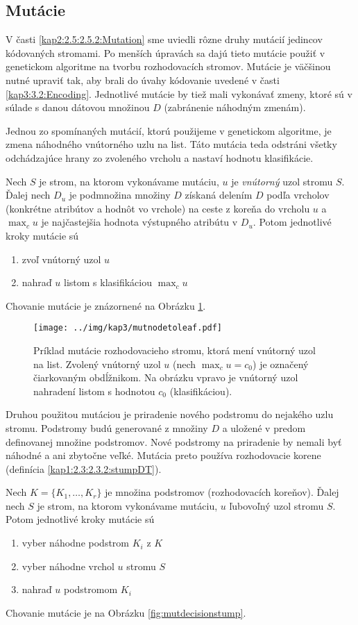 \subsection{Mutácie}\label{kap3:3.4:3.4.2:Mutation}
V časti \ref{kap2:2.5:2.5.2:Mutation} sme uviedli rôzne druhy mutácií jedincov kódovaných stromami. Po menších úpravách sa dajú tieto mutácie použiť v genetickom algoritme na tvorbu rozhodovacích stromov. Mutácie je väčšinou nutné upraviť tak, aby brali do úvahy kódovanie uvedené v časti \ref{kap3:3.2:Encoding}. Jednotlivé mutácie by tiež mali vykonávať zmeny, ktoré sú v súlade s danou dátovou množinou $D$ (zabránenie náhodným zmenám).

Jednou zo spomínaných mutácií, ktorú použijeme v genetickom algoritme, je zmena náhodného vnútorného uzlu na list. Táto mutácia teda odstráni všetky odchádzajúce hrany zo zvoleného vrcholu a nastaví hodnotu klasifikácie.

Nech $S$ je strom, na ktorom vykonávame mutáciu, $u$ je \emph{vnútorný} uzol stromu $S$. Ďalej nech $D_u$ je podmnožina množiny $D$ získaná delením $D$ podľa vrcholov (konkrétne atribútov a hodnôt vo vrchole) na ceste z koreňa do vrcholu $u$ a $\max_c u$ je najčastejšia hodnota výstupného atribútu v $D_u$. Potom jednotlivé kroky mutácie sú
\begin{enumerate}
\item zvoľ vnútorný uzol $u$
\item nahraď $u$ listom s klasifikáciou $\max_c u$
\end{enumerate}
Chovanie mutácie je znázornené na Obrázku \ref{fig:mutnodetoleaf}.

\begin{figure}[h]
\centering
\centerline{\mbox{\texttt{[image: ../img/kap3/mutnodetoleaf.pdf]}}}
\caption{Príklad mutácie rozhodovacieho stromu, ktorá mení vnútorný uzol na list. Zvolený vnútorný uzol $u$ (nech $\max_c u = c_0$) je označený čiarkovaným obdĺžnikom. Na obrázku vpravo je vnútorný uzol nahradení listom s hodnotou $c_0$ (klasifikáciou).}\label{fig:mutnodetoleaf}
\end{figure}

Druhou použitou mutáciou je priradenie nového podstromu do nejakého uzlu stromu. Podstromy budú generované z množiny $D$ a uložené v predom definovanej množine podstromov. Nové podstromy na priradenie by nemali byť náhodné a ani zbytočne veľké. Mutácia preto používa rozhodovacie korene (definícia \ref{kap1:2.3:2.3.2:stumpDT}).

Nech $K=\{K_1,\ldots,K_r\}$ je množina podstromov (rozhodovacích koreňov). Ďalej nech $S$ je strom, na ktorom vykonávame mutáciu, $u$ ľubovoľný uzol stromu $S$. Potom jednotlivé kroky mutácie sú 
\begin{enumerate}
\item vyber náhodne podstrom $K_i$ z $K$
\item vyber náhodne vrchol $u$ stromu $S$
\item nahraď $u$ podstromom $K_i$
\end{enumerate}
Chovanie mutácie je na Obrázku \ref{fig:mutdecisionstump}.

